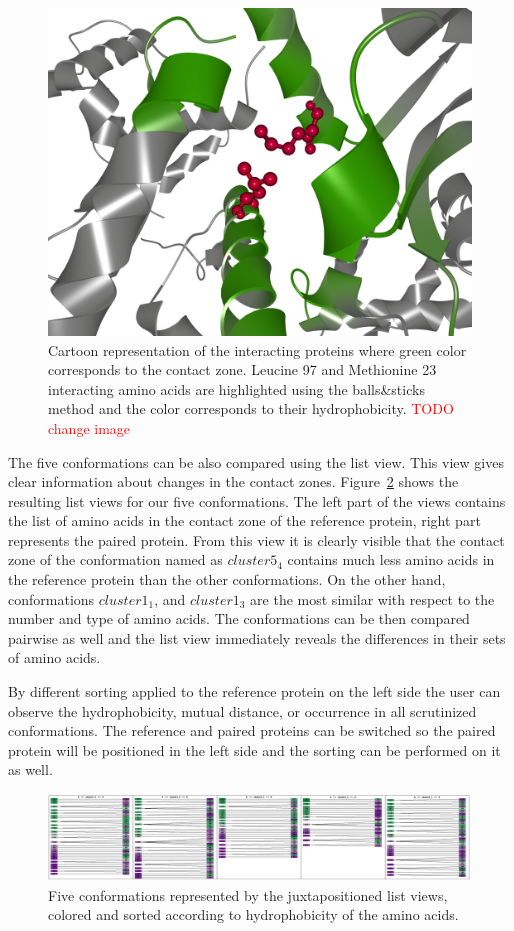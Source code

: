 \documentclass[journal]{vgtc}                %
\begin{document}
\begin{figure}[bt]
  \centering
  \includegraphics[width=0.8\columnwidth]{contact.png}
  \caption{Cartoon representation of the interacting proteins where green color corresponds to the contact zone. Leucine 97 and Methionine 23 interacting amino acids are highlighted using the balls\&sticks method and the color corresponds to their hydrophobicity. \textcolor{red}{TODO change image}}
  \label{fig:contact}
\end{figure}

The five conformations can be also compared using the list view.
This view gives clear information about changes in the contact zones.
Figure~\ref{fig:case3} shows the resulting list views for our five conformations.
The left part of the views contains the list of amino acids in the contact zone of the reference protein, right part represents the paired protein.
From this view it is clearly visible that the contact zone of the conformation named as $cluster5_4$ contains much less amino acids in the reference protein than the other conformations.
On the other hand, conformations $cluster1_1$, and $cluster1_3$ are the most similar with respect to the number and type of amino acids. 
The conformations can be then compared pairwise as well and the list view immediately reveals the differences in their sets of amino acids.

By different sorting applied to the reference protein on the left side the user can observe the hydrophobicity, mutual distance, or occurrence in all scrutinized conformations.
The reference and paired proteins can be switched so the paired protein will be positioned in the left side and the sorting can be performed on it as well.

\begin{figure}[bt]
  \centering
  \includegraphics[width=1.0\linewidth]{case3.png}
  \caption{Five conformations represented by the juxtapositioned list views, colored and sorted according to hydrophobicity of the amino acids.}
  \label{fig:case3}
\end{figure}
\end{document}
